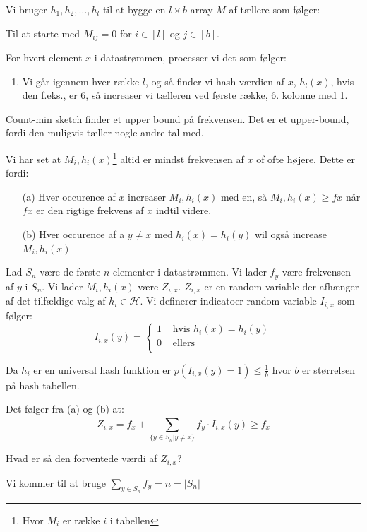 \documentclass[11pt]{article}
\theoremstyle{definition}
\theoremstyle{remark}
\begin{document}
Vi bruger $h_{1}, h_{2}, \ldots, h_{l}$ til at bygge en $l \times b$ array $M$ af tællere som følger:

Til at starte med $M_{ij} = 0$ for $i \in [l]$ og $j \in [b]$.

For hvert element $x$ i datastrømmen, processer vi det som følger:
\begin{enumerate}
\item Vi går igennem hver række $l$, og så finder vi hash-værdien af $x$, $h_{l}(x)$, hvis den f.eks., er 6, så increaser vi tælleren ved første række, 6. kolonne med 1. 
\end{enumerate}

Count-min sketch finder et upper bound på frekvensen. Det er et upper-bound, fordi den muligvis tæller nogle andre tal med. 

Vi har set at $M_{i}, h_{i}(x)$\footnote{Hvor $M_{i}$ er række $i$ i tabellen} altid er mindst frekvensen af $x$ of ofte højere. Dette er fordi:
\begin{enumerate}
\item[(a)] Hver occurence af $x$ increaser $M_{i}, h_{i}(x)$ med en, så $M_{i}, h_{i}(x) \geq fx$ når $fx$ er den rigtige frekvens af $x$ indtil videre. 
\item[(b)] Hver occurence af a $y \neq x$ med $h_{i}(x) = h_{i}(y)$ wil også increase $M_{i}, h_{i}(x)$
\end{enumerate}


Lad $S_{n}$ være de første $n$ elementer i datastrømmen. Vi lader $f_{y}$ være frekvensen af $y$ i $S_{n}$. Vi lader $M_{i}, h_{i}(x)$ være $Z_{i,x}$. $Z_{i,x}$ er en random variable der afhænger af det tilfældige valg af $h_{i} \in \mathcal{H}$.
Vi definerer indicatoer random variable $I_{i,x}$ som følger:
\[
I_{i,x}(y) = \begin{cases}
  1 & \text{ hvis } h_{i}(x) = h_{i}(y)\\
  0 & \text{ ellers }\\
\end{cases}
\]

Da $h_{i}$ er en universal hash funktion er $p(I_{i,x}(y) = 1) \leq \frac{1}{b}$ hvor $b$ er størrelsen på hash tabellen.

Det følger fra (a) og (b) at:
\[
Z_{i,x} = f_{x} + \sum_{\{ y \in S_{n} | y \neq x \}}^{} f_{y} \cdot I_{i,x}(y) \geq f_{x}
\]

Hvad er så den forventede værdi af $Z_{i,x}$?

Vi kommer til at bruge $\sum_{y \in S_{n}}^{}f_{y}=n=|S_{n}|$
\end{document}
